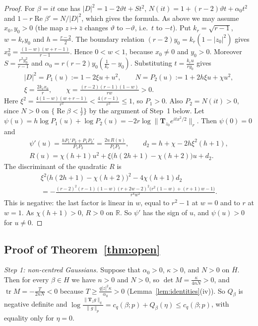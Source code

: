 \documentclass[11pt]{amsart}
\theoremstyle{definition}
\newcommand{\R}{\mathbb{R}}
\newcommand{\Rea}{\operatorname{Re}}
\newcommand{\bT}{\mathbf{T}}
\begin{document}
\begin{proof}
For $\beta=it$ one has $|D|^2=1-2\vartheta t+St^2$, $N(it)=1+(r-2)\vartheta t+\alpha_0t^2$ and
$1-r\Rea\beta'=N/|D|^2$, which gives the formula. As above we may assume $x_0,y_0>0$ (the map $z\mapsto\bar z$
changes $\vartheta$ to $-\vartheta$, i.e.\ $t$ to $-t$). Put $k_r=\sqrt{r-1}$, $w=k_ry_0$ and $h=\frac{r-2}2$. The
boundary relation $(r-2)y_0=k_r(1-|z_0|^2)$ gives $x_0^2=\frac{(1-w)(w+r-1)}{r-1}$. Hence $0<w<1$, because $x_0\ne0$
and $y_0>0$. Moreover $S=\frac{r^2y_0^2}{r-1}$ and $\alpha_0=r(r-2)y_0(\frac1{k_r}-y_0)$. Substituting
$t=\frac{k_ru}{ry_0}$ gives
\begin{gather*}
|D|^2=P_1(u):=1-2\xi u+u^2,\qquad N=P_2(u):=1+2h\xi u+\chi u^2,\\
\xi=\frac{2k_rx_0}r,\qquad \chi=\frac{(r-2)(r-1)(1-w)}{rw}>0 .
\end{gather*}
Here $\xi^2=\frac{4(1-w)(w+r-1)}{r^2}<\frac{4(r-1)}{r^2}\le1$, so $P_1>0$. Also $P_2=N(it)>0$, since $N>0$ on
$\{\Rea\beta<\frac1r\}$ by the argument of Step~1 below. Let $\psi(u)=h\log P_1(u)+\log P_2(u)=-2r\log\|\bT_{z_0}e^{itx^2/2}\|_r$.
Then $\psi(0)=0$ and
\begin{gather*}
\psi'(u)=\frac{hP_1'P_2+P_1P_2'}{P_1P_2}=\frac{2u\,R(u)}{P_1P_2},\qquad d_2=h+\chi-2h\xi^2(h+1),\\
R(u)=\chi(h+1)u^2+\xi\big(h(2h+1)-\chi(h+2)\big)u+d_2 .
\end{gather*}
The discriminant of the quadratic $R$ is
\begin{multline*}
\xi^2\big(h(2h+1)-\chi(h+2)\big)^2-4\chi(h+1)d_2\\
=-\frac{(r-2)^2(r-1)(1-w)(r+2w-2)^2\big(r^2(1-w)+(r+1)w-1\big)}{r^4w^2}.
\end{multline*}
This is negative: the last factor is linear in $w$, equal to $r^2-1$ at $w=0$ and to $r$ at $w=1$. As
$\chi(h+1)>0$, $R>0$ on $\R$. So $\psi'$ has the sign of $u$, and $\psi(u)>0$ for $u\ne0$.
\end{proof}

\subsection{Proof of Theorem~\ref{thm:open}}
\emph{Step 1: non-centred Gaussians.} Suppose that $\alpha_0>0$, $\kappa>0$, and $N>0$ on $\overline H$. Then for
every $\beta\in H$ we have $n>0$ and $N>0$, so $\det M=\frac{\kappa}{4nN}>0$, and $\operatorname{tr}M=-\frac T{2nN}<0$
because $T\ge\frac{q|z|^2\kappa}{\alpha_0}>0$ (Lemma~\ref{lem:identities}(iv)). So $Q_\beta$ is negative definite and
$\log\frac{\|\bT_zg\|_q}{\|g\|_p}=c_q(\beta;p)+Q_\beta(\eta)\le c_q(\beta;p)$, with equality only for $\eta=0$.
\end{document}
